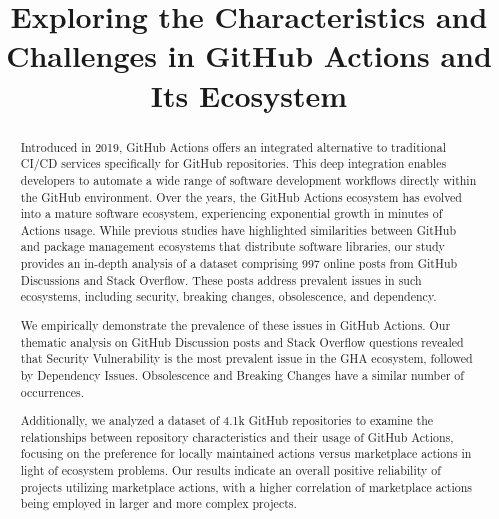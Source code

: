 \documentclass[conference]{IEEEtran}
\begin{document}
\title{Exploring the Characteristics and Challenges in GitHub Actions and Its Ecosystem\\}

\author{
\and
{}
}

\maketitle

\begin{abstract}
  Introduced in 2019, GitHub Actions offers an integrated alternative to traditional CI/CD services specifically for GitHub repositories. This deep integration enables developers to automate a wide range of software development workflows directly within the GitHub environment. Over the years, the GitHub Actions ecosystem has evolved into a mature software ecosystem, experiencing exponential growth in minutes of Actions usage. While previous studies have highlighted similarities between GitHub and package management ecosystems that distribute software libraries, our study provides an in-depth analysis of a dataset comprising 997 online posts from GitHub Discussions and Stack Overflow. These posts address prevalent issues in such ecosystems, including security, breaking changes, obsolescence, and dependency. 

  We empirically demonstrate the prevalence of these issues in GitHub Actions. Our thematic analysis on GitHub Discussion posts and Stack Overflow questions revealed that Security Vulnerability is the most prevalent issue in the GHA ecosystem, followed by Dependency Issues. Obsolescence and Breaking Changes have a similar number of occurrences. 

   Additionally, we analyzed a dataset of 4.1k GitHub repositories to examine the relationships between repository characteristics and their usage of GitHub Actions, focusing on the preference for locally maintained actions versus marketplace actions in light of ecosystem problems. Our results indicate an overall positive reliability of projects utilizing marketplace actions, with a higher correlation of marketplace actions being employed in larger and more complex projects. \\ 
 \end{abstract}
\end{document}
